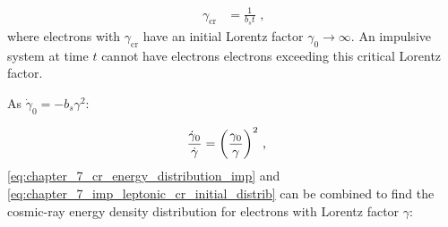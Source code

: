 \begin{equation}
    \begin{aligned}
    \gamma_\text{cr}&=\frac{1}{b_s t} \text{ ,}
    \end{aligned}\label{eq:chapter_7_imp_lep_critical_lorentz}
\end{equation}
\noindent where electrons with $\gamma_\text{cr}$ have an initial Lorentz factor $\gamma_0\rightarrow \infty$. An impulsive system at time $t$ cannot have electrons electrons exceeding this critical Lorentz factor.
\par
\noindent As $\dot{\gamma}_0=-b_s\gamma^2$:

\begin{equation}
	\begin{aligned}
		\frac{\dot{\gamma}_0}{\dot{\gamma}}&=\qty(\frac{\gamma_0}{\gamma})^2 \text{ ,}
	\end{aligned} \label{eq:chapter_7_gamma_gamma_0_ratio}
\end{equation}
\noindent \autoref{eq:chapter_7_cr_energy_distribution_imp} and \autoref{eq:chapter_7_imp_leptonic_cr_initial_distrib} can be combined to find the cosmic-ray energy density distribution for electrons with Lorentz factor $\gamma$:

